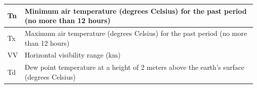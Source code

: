 \begin{table}[H]
\begin{tabular}{|l|p{}|}
Tn   & Minimum air temperature (degrees Celsius) for the past period (no more than 12 hours)                                                                                          \\ \hline
Tx   & Maximum air temperature (degrees Celsius) for the past period (no more than 12 hours)                                                                                          \\ \hline
VV   & Horizontal visibility range (km)                                                                                                                                               \\ \hline
Td   & Dew point temperature at a height of 2 meters above the earth's surface (degrees Celsius)                                                                                      \\ \hline
\end{tabular}
\end{table}

